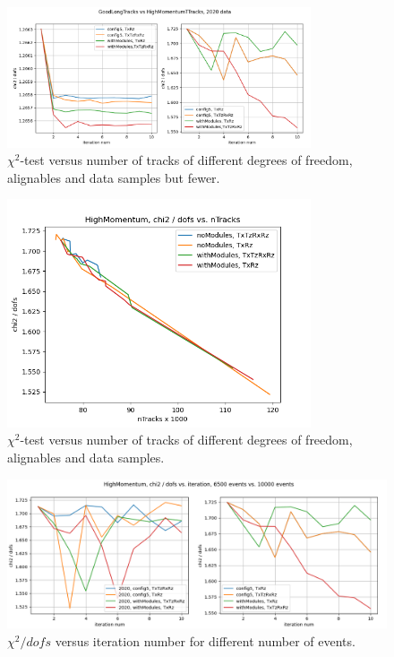 \begin{figure}
  \centering
  \includegraphics[width=0.8\textwidth]{plots/GL_HM_chi2_2020.png}
  \caption{$\chi^2$-test versus number of tracks of different degrees of freedom, alignables and data samples but fewer.}
  \label{fig:chi2iter}
\end{figure}

\begin{figure}
  \centering
  \includegraphics[width=0.8\textwidth]{plots/nov_21/chi2_vs_ntracks_all.png}
  \caption{$\chi^2$-test versus number of tracks of different degrees of freedom, alignables and data samples.}
  \label{fig:chi2tracks}
\end{figure}

\begin{figure}
  \centering
  \includegraphics[width=\textwidth]{plots/LHCB_week_dec/chi2_vs_iter_normal.png}
  \caption{$\chi^2 / dofs$ versus iteration number for different number of events.}
  \label{fig:chi2iterdec}
\end{figure}

